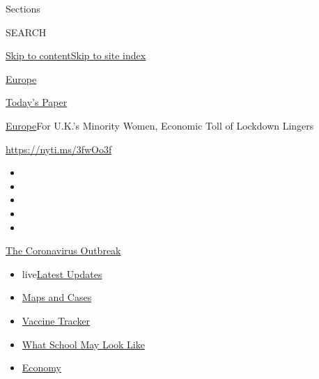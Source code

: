 Sections

SEARCH

\protect\hyperlink{site-content}{Skip to
content}\protect\hyperlink{site-index}{Skip to site index}

\href{https://www.nytimes.com/section/world/europe}{Europe}

\href{https://myaccount.nytimes.com/auth/login?response_type=cookie\&client_id=vi}{}

\href{https://www.nytimes.com/section/todayspaper}{Today's Paper}

\href{/section/world/europe}{Europe}\textbar{}For U.K.'s Minority Women,
Economic Toll of Lockdown Lingers

\url{https://nyti.ms/3fwOo3f}

\begin{itemize}
\item
\item
\item
\item
\item
\end{itemize}

\href{https://www.nytimes.com/news-event/coronavirus?action=click\&pgtype=Article\&state=default\&region=TOP_BANNER\&context=storylines_menu}{The
Coronavirus Outbreak}

\begin{itemize}
\tightlist
\item
  live\href{https://www.nytimes.com/2020/08/01/world/coronavirus-covid-19.html?action=click\&pgtype=Article\&state=default\&region=TOP_BANNER\&context=storylines_menu}{Latest
  Updates}
\item
  \href{https://www.nytimes.com/interactive/2020/us/coronavirus-us-cases.html?action=click\&pgtype=Article\&state=default\&region=TOP_BANNER\&context=storylines_menu}{Maps
  and Cases}
\item
  \href{https://www.nytimes.com/interactive/2020/science/coronavirus-vaccine-tracker.html?action=click\&pgtype=Article\&state=default\&region=TOP_BANNER\&context=storylines_menu}{Vaccine
  Tracker}
\item
  \href{https://www.nytimes.com/interactive/2020/07/29/us/schools-reopening-coronavirus.html?action=click\&pgtype=Article\&state=default\&region=TOP_BANNER\&context=storylines_menu}{What
  School May Look Like}
\item
  \href{https://www.nytimes.com/live/2020/07/31/business/stock-market-today-coronavirus?action=click\&pgtype=Article\&state=default\&region=TOP_BANNER\&context=storylines_menu}{Economy}
\end{itemize}

